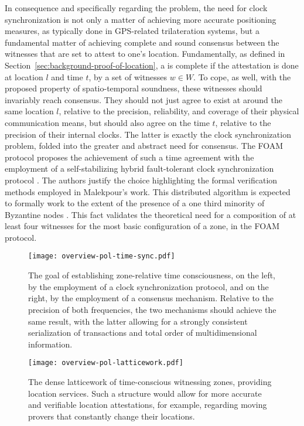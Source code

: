 In consequence and specifically regarding the \pol{} problem, the need for clock synchronization is not only a matter of achieving more accurate positioning measures, as typically done in GPS-related trilateration systems, but a fundamental matter of achieving complete and sound consensus between the witnesses that are set to attest to one's location. Fundamentally, as defined in Section~\ref{sec:background-proof-of-location}, a \pol{} is complete if the attestation is done at location $l$ and time $t$, by a set of witnesses $w \in W$. To cope, as well, with the proposed property of spatio-temporal soundness, these witnesses should invariably reach consensus. They should not just agree to exist at around the same location $l$, relative to the precision, reliability, and coverage of their physical communication means, but should also agree on the time $t$, relative to the precision of their internal clocks. The latter is exactly the clock synchronization problem, folded into the greater and abstract need for consensus. The FOAM protocol proposes the achievement of such a time agreement with the employment of a self-stabilizing hybrid fault-tolerant clock synchronization protocol \cite{foam-white-paper, malekpour2015self}. The authors justify the choice highlighting the formal verification methods employed in Malekpour's work. This distributed algorithm is expected to formally work to the extent of the presence of a one third minority of Byzantine nodes \cite{lamport2019byzantine}. This fact validates the theoretical need for a composition of at least four witnesses for the most basic configuration of a zone, in the FOAM protocol. 

\begin{figure}[b!]
    \begin{center}
    \texttt{[image: overview-pol-time-sync.pdf]}
    \caption{The goal of establishing zone-relative time consciousness, on the left, by the employment of a clock synchronization protocol, and on the right, by the employment of a consensus mechanism. Relative to the precision of both frequencies, the two mechanisms should achieve the same result, with the latter allowing for a strongly consistent serialization of transactions and total order of multidimensional information.}
    \vspace{-1cm}
    \label{fig:proof-of-location-overview-time-sync}
    \end{center}
\end{figure}

\begin{figure}[b!]
    \begin{center}
    \texttt{[image: overview-pol-latticework.pdf]}
    \caption{The dense latticework of time-conscious witnessing zones, providing location services. Such a structure would allow for more accurate and verifiable location attestations, for example, regarding moving provers that constantly change their locations.}
    \vspace{-1cm}
    \label{fig:proof-of-location-overview-latticework}
    \end{center}
\end{figure}

